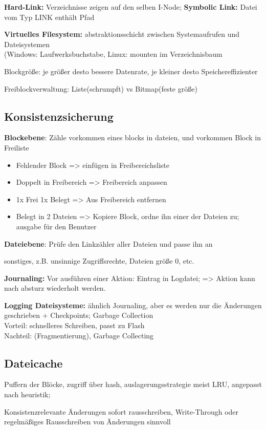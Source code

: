 \textbf{Hard-Link:} Verzeichnisse zeigen auf den selben I-Node;
\textbf{Symbolic Link:} Datei vom Typ LINK enthält Pfad

\textbf{Virtuelles Filesystem:} abstraktionsschicht zwischen Systemaufrufen und Dateisystemen \\
(Windows: Laufwerksbuchstabe, Linux: mounten im Verzeichnisbaum

Blockgröße: je größer desto bessere Datenrate, je kleiner desto Speichereffizienter

Freiblockverwaltung: Liste(schrumpft) vs Bitmap(feste größe)

\subsection{Konsistenzsicherung}
\textbf{Blockebene}: Zähle vorkommen eines blocks in dateien, und vorkommen Block in Freiliste
\begin{itemize}
\item Fehlender Block => einfügen in Freibereichsliste
\item Doppelt in Freibereich => Freibereich anpassen
\item 1x Frei 1x Belegt => Aus Freibereich entfernen
\item Belegt in 2 Dateien => Kopiere Block, ordne ihn einer der Dateien zu; ausgabe für den Benutzer
\end{itemize}

\textbf{Dateiebene}: Prüfe den Linkzähler aller Dateien und passe ihn an

sonstiges, z.B. unsinnige Zugriffsrechte, Dateien größe 0, etc.

\textbf{Journaling:} Vor ausführen einer Aktion: Eintrag in Logdatei; => Aktion kann nach absturz wiederholt werden.

\textbf{Logging Dateisysteme: }
ähnlich Journaling, aber es werden nur die Änderungen geschrieben + Checkpoints; Garbage Collection\\
Vorteil: schnelleres Schreiben, passt zu Flash\\
Nachteil: (Fragmentierung), Garbage Collecting
\subsection{Dateicache}
Puffern der Blöcke, zugriff über hash, auslagerungsstrategie meist LRU, angepasst nach heuristik;

Konsistenzrelevante Änderungen sofort rausschreiben, Write-Through oder regelmäßiges Rausschreiben von Änderungen sinnvoll


